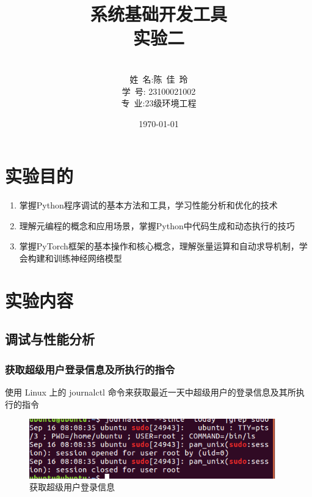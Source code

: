 \documentclass[UTF8]{ctexart}
\title{{\Huge 系统基础开发工具{\large\linebreak\\}}{\Large 实验二\linebreak\linebreak}}
\author{\\姓\ 名:陈\ 佳\ 玲\\
学\ 号: 23100021002\\
专\ 业:23级环境工程\\
}
\date{\today}
\begin{document}


\fancyfoot[C]{\thepage}

\maketitle
\tableofcontents
\newpage

\section{实验目的}
 \begin{enumerate}
    \item 掌握Python程序调试的基本方法和工具，学习性能分析和优化的技术
    
    \item 理解元编程的概念和应用场景，掌握Python中代码生成和动态执行的技巧
    
    \item 掌握PyTorch框架的基本操作和核心概念，理解张量运算和自动求导机制，学会构建和训练神经网络模型
\end{enumerate}


\section{实验内容}

\subsection{调试与性能分析}

\subsubsection{获取超级用户登录信息及所执行的指令}
使用 Linux 上的 journalctl 命令来获取最近一天中超级用户的登录信息及其所执行的指令
\begin{figure}[H]
    \centering
    \includegraphics[width=0.95\textwidth]{picture/查看日志.png}
    \caption{获取超级用户登录信息}
\end{figure}
\end{document}

